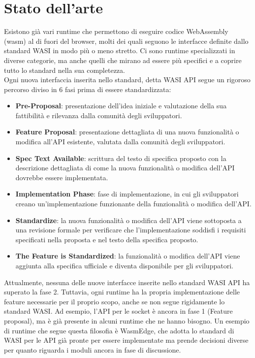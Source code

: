 \section{Stato dell'arte}
Esistono già vari runtime che permettono di eseguire codice WebAssembly (wasm) al di fuori del browser, molti dei quali seguono le interfacce definite dallo standard WASI in modo più o meno stretto. Ci sono runtime specializzati in diverse categorie, ma anche quelli che mirano ad essere più specifici e a coprire tutto lo standard nella sua completezza.
\\
Ogni nuova interfaccia inserita nello standard, detta WASI API segue un rigoroso percorso diviso in 6 fasi prima di essere standardizzata:
\begin{itemize}
    \item \textbf{Pre-Proposal}: presentazione dell'idea iniziale e valutazione della sua fattibilità e rilevanza dalla comunità degli sviluppatori.
    \item \textbf{Feature Proposal}: presentazione dettagliata di una nuova funzionalità o modifica all'API esistente, valutata dalla comunità degli sviluppatori.
    \item \textbf{Spec Text Available}: scrittura del testo di specifica proposto con la descrizione dettagliata di come la nuova funzionalità o modifica dell'API dovrebbe essere implementata.
    \item \textbf{Implementation Phase}: fase di implementazione, in cui gli sviluppatori creano un'implementazione funzionante della funzionalità o modifica dell'API.
    \item \textbf{Standardize}: la nuova funzionalità o modifica dell'API viene sottoposta a una revisione formale per verificare che l'implementazione soddisfi i requisiti specificati nella proposta e nel testo della specifica proposto.
    \item \textbf{The Feature is Standardized}: la funzionalità o modifica dell'API viene aggiunta alla specifica ufficiale e diventa disponibile per gli sviluppatori.
\end{itemize}

\noindent
Attualmente, nessuna delle nuove interfacce inserite nello standard WASI API ha superato la fase 2. Tuttavia, ogni runtime ha la propria implementazione delle feature necessarie per il proprio scopo, anche se non segue rigidamente lo standard WASI. Ad esempio, l'API per le socket è ancora in fase 1 (Feature proposal), ma è già presente in alcuni runtime che ne hanno bisogno. Un esempio di runtime che segue questa filosofia è WasmEdge, che adotta lo standard di WASI per le API già pronte per essere implementate ma prende decisioni diverse per quanto riguarda i moduli ancora in fase di discussione.

